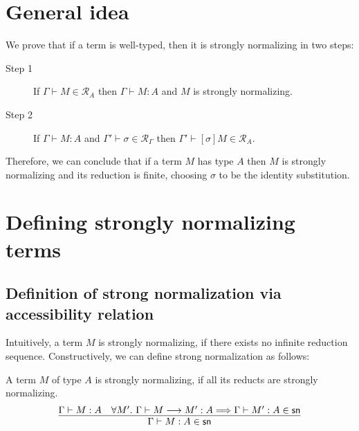 \documentclass{article}
\newcommand{\SN}{\mathsf{SN}}
\newcommand{\csn}{\mathsf{sn}}
\newcommand{\denot}[1]{\mathcal{R}_{#1}}
\newcommand{\inden}[3]{#1 \vdash #2 \in \denot{#3}}
\newcommand{\red}{\longrightarrow}
\newcommand{\imply}{\Longrightarrow}
\begin{document}
\section{General idea}

We prove that if a term is well-typed, then it is strongly normalizing in  two steps:

\begin{description}
\item[Step 1] If $\inden{\Gamma}{M}{A}$ then $\Gamma \vdash M : A$ and $M$ is strongly normalizing.
\item[Step 2] If $\Gamma \vdash M : A$ and $\inden{\Gamma'}{\sigma}{\Gamma}$ then $\inden{\Gamma'}{[\sigma]M}{A}$.
\end{description}

Therefore, we can conclude that if a term $M$ has type $A$ then $M$ is strongly normalizing and its reduction is finite, choosing $\sigma$ to be the identity substitution.




\section{Defining strongly normalizing terms}
\subsection{Definition of strong normalization via accessibility relation}
Intuitively, a term $M$ is strongly normalizing, if there exists no infinite reduction sequence. Constructively, we can define strong normalization as follows:

\begin{definition}\label{def:norm}
A term $M$ of type $A$ is strongly normalizing, if all its reducts are strongly
normalizing.\\
\[
\infer{\Gamma \vdash M : A \in \csn}
      {\Gamma \vdash M : A & \forall M'.~\Gamma \vdash M \red M' : A \imply \Gamma \vdash M' : A \in \csn}
\]
\end{definition}
\end{document}
